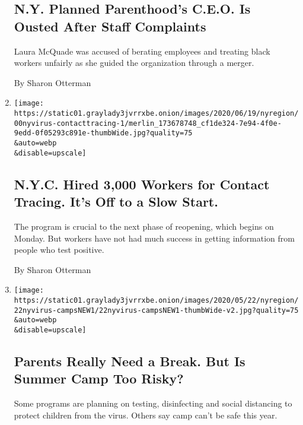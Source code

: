 \begin{enumerate}
  \hypertarget{ny-planned-parenthoods-ceo-is-ousted-after-staff-complaints}{%
  \subsection{N.Y. Planned Parenthood's C.E.O. Is Ousted After Staff
  Complaints}\label{ny-planned-parenthoods-ceo-is-ousted-after-staff-complaints}}

  Laura McQuade was accused of berating employees and treating black
  workers unfairly as she guided the organization through a merger.

  By Sharon Otterman
\item
  \href{/2020/06/21/nyregion/nyc-contact-tracing.html}{}

  \texttt{[image: https://static01.graylady3jvrrxbe.onion/images/2020/06/19/nyregion/00nyvirus-contacttracing-1/merlin\_173678748\_cf1de324-7e94-4f0e-9edd-0f05293c891e-thumbWide.jpg?quality=75\\\&auto=webp\\\&disable=upscale]}

  \hypertarget{nyc-hired-3000-workers-for-contact-tracing-its-off-to-a-slow-start}{%
  \subsection{N.Y.C. Hired 3,000 Workers for Contact Tracing. It's Off
  to a Slow
  Start.}\label{nyc-hired-3000-workers-for-contact-tracing-its-off-to-a-slow-start}}

  The program is crucial to the next phase of reopening, which begins on
  Monday. But workers have not had much success in getting information
  from people who test positive.

  By Sharon Otterman
\item
  \href{/2020/05/22/nyregion/summer-camp-coronavirus.html}{}

  \texttt{[image: https://static01.graylady3jvrrxbe.onion/images/2020/05/22/nyregion/22nyvirus-campsNEW1/22nyvirus-campsNEW1-thumbWide-v2.jpg?quality=75\\\&auto=webp\\\&disable=upscale]}

  \hypertarget{parents-really-need-a-break-but-is-summer-camp-too-risky}{%
  \subsection{Parents Really Need a Break. But Is Summer Camp Too
  Risky?}\label{parents-really-need-a-break-but-is-summer-camp-too-risky}}

  Some programs are planning on testing, disinfecting and social
  distancing to protect children from the virus. Others say camp can't
  be safe this year.


\end{enumerate}
